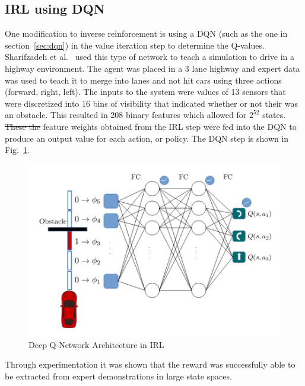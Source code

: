 \documentclass[12pt,american]{report}
\providecommand{\DIFaddtex}[1]{{\protect\color{blue}\uwave{#1}}} %
\providecommand{\DIFdeltex}[1]{{\protect\color{red}\sout{#1}}}                      %
\providecommand{\DIFaddbegin}{} %
\providecommand{\DIFaddend}{} %
\providecommand{\DIFdelbegin}{} %
\providecommand{\DIFdelend}{} %
\providecommand{\DIFaddFL}[1]{\DIFadd{#1}} %
\providecommand{\DIFaddbeginFL}{} %
\providecommand{\DIFaddendFL}{} %
\providecommand{\DIFdelbeginFL}{} %
\providecommand{\DIFdelendFL}{} %
\providecommand{\DIFadd}[1]{\texorpdfstring{\DIFaddtex{#1}}{#1}} %
\providecommand{\DIFdel}[1]{\texorpdfstring{\DIFdeltex{#1}}{}} %
\newcommand{\DIFscaledelfig}{0.5}
\newlength{\DIFdelgraphicswidth} %
\newlength{\DIFdelgraphicsheight} %
\newcommand{\DIFaddincludegraphics}[2][]{{\color{blue}\fbox{\DIFOincludegraphics[#1]{#2}}}} %
\newcommand{\DIFdelincludegraphics}[2][]{%
\sbox{\DIFdelgraphicsbox}{\DIFOincludegraphics[#1]{#2}}%
\settoboxwidth{\DIFdelgraphicswidth}{\DIFdelgraphicsbox} %
\settoboxtotalheight{\DIFdelgraphicsheight}{\DIFdelgraphicsbox} %
\scalebox{\DIFscaledelfig}{%
\parbox[b]{\DIFdelgraphicswidth}{\usebox{\DIFdelgraphicsbox}\\[-\baselineskip] \rule{\DIFdelgraphicswidth}{0em}}\llap{\resizebox{\DIFdelgraphicswidth}{\DIFdelgraphicsheight}{%
\setlength{\unitlength}{\DIFdelgraphicswidth}%
\begin{picture}(1,1)%
\thicklines\linethickness{2pt} %
{\color[rgb]{1,0,0}\put(0,0){\framebox(1,1){}}}%
{\color[rgb]{1,0,0}\put(0,0){\line( 1,1){1}}}%
{\color[rgb]{1,0,0}\put(0,1){\line(1,-1){1}}}%
\end{picture}%
}\hspace*{3pt}}} %
} %
\DeclareRobustCommand{\DIFaddbegin}{\DIFOaddbegin \let\includegraphics\DIFaddincludegraphics} %
\DeclareRobustCommand{\DIFaddend}{\DIFOaddend \let\includegraphics\DIFOincludegraphics} %
\DeclareRobustCommand{\DIFdelbegin}{\DIFOdelbegin \let\includegraphics\DIFdelincludegraphics} %
\DeclareRobustCommand{\DIFdelend}{\DIFOaddend \let\includegraphics\DIFOincludegraphics} %
\DeclareRobustCommand{\DIFaddbeginFL}{\DIFOaddbeginFL \let\includegraphics\DIFaddincludegraphics} %
\DeclareRobustCommand{\DIFaddendFL}{\DIFOaddendFL \let\includegraphics\DIFOincludegraphics} %
\DeclareRobustCommand{\DIFdelbeginFL}{\DIFOdelbeginFL \let\includegraphics\DIFdelincludegraphics} %
\DeclareRobustCommand{\DIFdelendFL}{\DIFOaddendFL \let\includegraphics\DIFOincludegraphics} %
\begin{document}
\subsection{IRL using DQN}
One modification to inverse reinforcement is using a DQN (such as the one in section~\ref{sec:dqn}) in the value iteration step to determine the Q-values. Sharifzadeh et al.~\cite{sharifzadeh2016learning} used this type of network to teach a simulation to drive in a highway environment. The agent was placed in a 3 lane highway and expert data was used to teach it to merge into lanes and not hit cars using three actions (forward, right, left).  The inputs to the system were values of 13 sensors that were discretized into 16 bins of visibility that indicated whether or not their was an obstacle. This resulted in 208 binary features which allowed for $2^{52}$ states. \DIFdelbegin \DIFdel{These the }\DIFdelend \DIFaddbegin \DIFadd{The }\DIFaddend feature weights obtained from the IRL step were fed into the DQN to produce an output value for each action, or policy. The DQN step is shown in Fig.~\ref{fig:irl-dqn}.
\begin{figure}
\centering
\DIFdelbeginFL %
\DIFdelendFL \DIFaddbeginFL \includegraphics[scale=1.5]{images/irl-dqn.png}
\DIFaddendFL \caption{Deep Q-Network Architecture in IRL\DIFaddbeginFL \DIFaddFL{.}\DIFaddendFL ~\cite{sharifzadeh2016learning}}
\label{fig:irl-dqn}
\end{figure}
Through experimentation it was shown that the reward was successfully able to be extracted from expert demonstrations in large state spaces.
\end{document}
